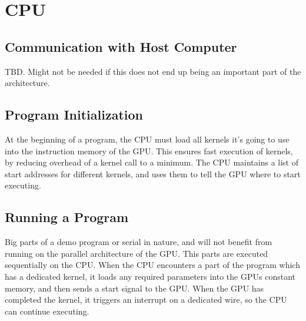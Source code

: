 \chapter{CPU}



\section{Communication with Host Computer}
TBD. Might not be needed if this does not end up being an important part of the architecture.



\section{Program Initialization}
At the beginning of a program, the CPU must load all kernels it's going to use into the instruction memory of the GPU. This ensures fast execution of kernels, by reducing overhead of a kernel call to a minimum.
The CPU maintains a list of start addresses for different kernels, and uses them to tell the GPU where to start executing.

\section{Running a Program}
Big parts of a demo program or serial in nature, and will not benefit from running on the parallel architecture of the GPU.
This parts are executed sequentially on the CPU.
When the CPU encounters a part of the program which has a dedicated kernel,
it loads any required parameters into the GPUs constant memory, and then sends a start signal to the GPU.
When the GPU has completed the kernel, it triggers an interrupt on a dedicated wire,
so the CPU can continue executing.
